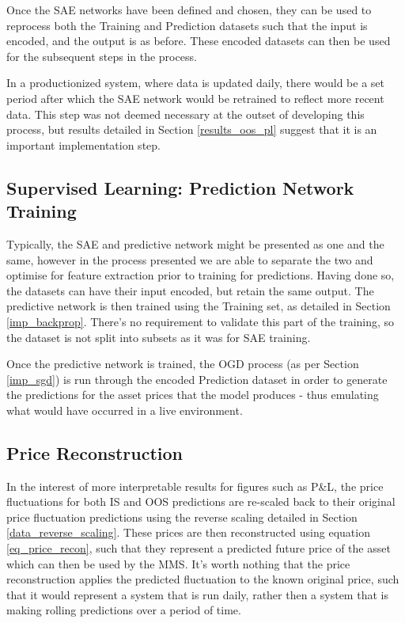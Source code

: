\documentclass[a4paper,11pt,oneside]{article}
\theoremstyle{plain}
\theoremstyle{definition}
\begin{document}
	Once the SAE networks have been defined and chosen, they can be used to reprocess both the Training and Prediction datasets such that the input is encoded, and the output is as before. These encoded datasets can then be used for the subsequent steps in the process. \newline
	
	In a productionized system, where data is updated daily, there would be a set period after which the SAE network would be retrained to reflect more recent data. This step was not deemed necessary at the outset of developing this process, but results detailed in Section \ref{results_oos_pl} suggest that it is an important implementation step.\newline
	
	\subsection{Supervised Learning: Prediction Network Training}\label{proc_predictionnetwork}
	
	Typically, the SAE and predictive network might be presented as one and the same, however in the process presented we are able to separate the two and optimise for feature extraction prior to training for predictions. Having done so, the datasets can have their input encoded, but retain the same output. The predictive network is then trained using the Training set, as detailed in Section \ref{imp_backprop}. There's no requirement to validate this part of the training, so the dataset is not split into subsets as it was for SAE training. \newline
	
	Once the predictive network is trained, the OGD process (as per Section \ref{imp_sgd}) is run through the encoded Prediction dataset in order to generate the predictions for the asset prices that the model produces - thus emulating what would have occurred in a live environment. \newline
	
	\subsection{Price Reconstruction}\label{proc_precerecon}
	
	In the interest of more interpretable results for figures such as P\&L, the price fluctuations for both IS and OOS predictions are re-scaled back to their original price fluctuation predictions using the reverse scaling detailed in Section \ref{data_reverse_scaling}. These prices are then reconstructed using equation \eqref{eq_price_recon}, such that they represent a predicted future price of the asset which can then be used by the MMS. It's worth nothing that the price reconstruction applies the predicted fluctuation to the known original price, such that it would represent a system that is run daily, rather then a system that is making rolling predictions over a period of time. 
	
\end{document}

